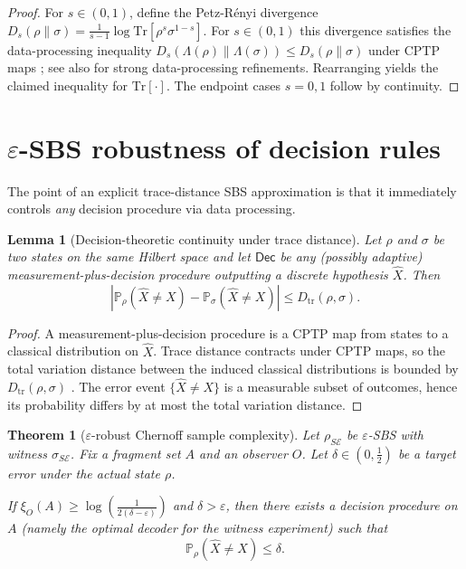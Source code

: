 \documentclass[11pt]{article}
\newcommand{\cE}{\mathcal{E}}
\newcommand{\Dtr}{D_{\mathrm{tr}}}
\newcommand{\Prob}{\mathbb{P}}
\newcommand{\1}{\mathbf{1}}
\newcommand{\QCBdist}{\xi}
\theoremstyle{definition}
\theoremstyle{plain}
\newtheorem{theorem}{Theorem}
\newtheorem{lemma}{Lemma}
\begin{document}
\begin{proof}
For $s\in(0,1)$, define the Petz-R\'enyi divergence
$D_s(\rho\|\sigma)=\frac{1}{s-1}\log \mathrm{Tr}[\rho^s\sigma^{1-s}]$.
For $s\in(0,1)$ this divergence satisfies the data-processing inequality
$D_s(\Lambda(\rho)\|\Lambda(\sigma))\le D_s(\rho\|\sigma)$ under CPTP maps \citep{Petz1986,MosonyiOgawa2015,Tomamichel2016}; see also \citet{PolyanskiyWu2016SDPI} for strong data-processing refinements.
Rearranging yields the claimed inequality for $\mathrm{Tr}[\cdot]$.
The endpoint cases $s=0,1$ follow by continuity.
\end{proof}

\section{$\varepsilon$-SBS robustness of decision rules}

The point of an explicit trace-distance SBS approximation is that it immediately controls \emph{any} decision procedure via data processing.

\begin{lemma}[Decision-theoretic continuity under trace distance]
\label{lem:decision-cont}
Let $\rho$ and $\sigma$ be two states on the same Hilbert space and let $\mathsf{Dec}$ be any (possibly adaptive) measurement-plus-decision procedure outputting a discrete hypothesis $\widehat{X}$.
Then
\[
\left|\Prob_\rho(\widehat{X}\neq X)-\Prob_\sigma(\widehat{X}\neq X)\right|
\le \Dtr(\rho,\sigma).
\]
\end{lemma}

\begin{proof}
A measurement-plus-decision procedure is a CPTP map from states to a classical distribution on $\widehat{X}$.
Trace distance contracts under CPTP maps, so the total variation distance between the induced classical distributions is bounded by $\Dtr(\rho,\sigma)$ \citep{Watrous2018}.
The error event $\{\widehat{X}\neq X\}$ is a measurable subset of outcomes, hence its probability differs by at most the total variation distance.
\end{proof}

\begin{theorem}[$\varepsilon$-robust Chernoff sample complexity]
\label{thm:eps-robust}
Let $\rho_{S\cE}$ be $\varepsilon$-SBS with witness $\sigma_{S\cE}$.
Fix a fragment set $A$ and an observer $O$.
Let $\delta\in(0,\tfrac12)$ be a target error under the \emph{actual} state $\rho$.

If $\QCBdist_O(A)\ge \log\!\left(\frac{1}{2(\delta-\varepsilon)}\right)$ and $\delta>\varepsilon$, then there exists a decision procedure on $A$ (namely the optimal decoder for the witness experiment) such that
\[
\Prob_{\rho}(\widehat{X}\neq X)\le \delta.
\]
\end{theorem}
\end{document}
